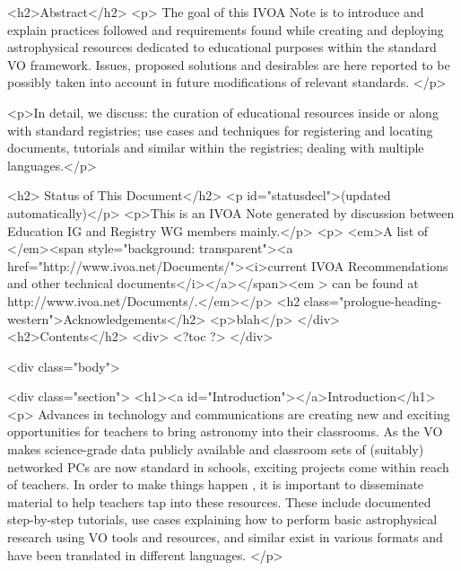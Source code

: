 <h2>Abstract</h2>
<p>
The goal of this IVOA Note is to introduce and explain practices followed
and requirements found while creating and 
deploying astrophysical resources 
dedicated to educational purposes within the standard VO framework.
Issues, proposed solutions and desirables are here reported to be
possibly taken into account in future modifications of relevant
standards.
</p>

<p>In detail, we discuss: the curation of educational resources inside or
along with standard registries; use cases and techniques for registering
and locating documents, tutorials and similar within the registries;
dealing with multiple languages.</p>

<h2> Status of This Document</h2>
<p id="statusdecl">(updated automatically)</p>
<p>This is an IVOA Note generated by discussion between Education IG and Registry WG members mainly.</p>
<p> <em>A list of </em><span style="background: transparent"><a  href="http://www.ivoa.net/Documents/"><i>current
  IVOA Recommendations and other technical documents</i></a></span><em > can be found at http://www.ivoa.net/Documents/.</em></p>
<h2 class="prologue-heading-western">Acknowledgements</h2>
<p>blah</p>
</div>
<h2>Contents</h2>
<div>
<?toc ?>
</div>

<div class="body">

<div class="section">
<h1><a id="Introduction"></a>Introduction</h1>
<p>
Advances in technology and communications are creating new and exciting 
opportunities for teachers to bring astronomy into their 
classrooms.  As the VO makes science-grade data publicly available and
classroom sets of (suitably) networked PCs are now standard in schools,
exciting projects come within reach of teachers.  In order to make things happen
, it is important to disseminate material to help teachers
tap into these resources.  These include documented step-by-step
tutorials, use cases explaining how to perform basic astrophysical research 
using VO tools and resources, and similar exist in various formats and
have been translated in different languages.
</p>

